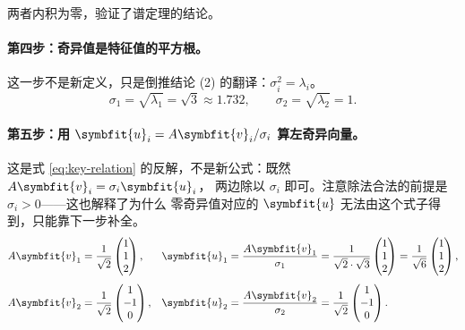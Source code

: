 \documentclass[UTF8, 11pt, a4paper, fontset=windows]{ctexart}
\theoremstyle{cnthm}
\theoremstyle{cndef}
\newcommand{\bu}{\symbfit{u}}
\newcommand{\vv}{\symbfit{v}}
\begin{document}
两者内积为零，验证了谱定理的结论。

\paragraph{第四步：奇异值是特征值的平方根。}
这一步不是新定义，只是倒推结论 (2) 的翻译：$\sigma_i^2=\lambda_i$。
\begin{equation}
  \sigma_1=\sqrt{\lambda_1}=\sqrt3\approx1.732,\qquad
  \sigma_2=\sqrt{\lambda_2}=1 .
\end{equation}

\paragraph{第五步：用 $\bu_i=A\vv_i/\sigma_i$ 算左奇异向量。}
这是式 \eqref{eq:key-relation} 的反解，不是新公式：既然 $A\vv_i=\sigma_i\bu_i$，
两边除以 $\sigma_i$ 即可。注意除法合法的前提是 $\sigma_i>0$——这也解释了为什么
零奇异值对应的 $\bu$ 无法由这个式子得到，只能靠下一步补全。
\begin{align}
  A\vv_1&=\frac{1}{\sqrt2}\begin{pmatrix}1\\1\\2\end{pmatrix},
  &\bu_1&=\frac{A\vv_1}{\sigma_1}
  =\frac{1}{\sqrt2\cdot\sqrt3}\begin{pmatrix}1\\1\\2\end{pmatrix}
  =\frac{1}{\sqrt6}\begin{pmatrix}1\\1\\2\end{pmatrix},\\[4pt]
  A\vv_2&=\frac{1}{\sqrt2}\begin{pmatrix}1\\-1\\0\end{pmatrix},
  &\bu_2&=\frac{A\vv_2}{\sigma_2}
  =\frac{1}{\sqrt2}\begin{pmatrix}1\\-1\\0\end{pmatrix}.
\end{align}
\end{document}
